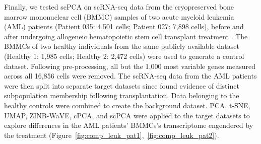 Finally, we tested scPCA on scRNA-seq data from the cryopreserved bone marrow mononuclear cell (BMMC) samples of two acute myeloid leukemia (AML) patients (Patient 035: 4,501 cells; Patient 027: 7,898 cells), before and after undergoing allogeneic hematopoietic stem cell transplant treatment \citep{Zheng2017}. The BMMCs of two healthy individuals from the same publicly available dataset (Healthy 1: 1,985 cells; Healthy 2: 2,472 cells) were used to generate a control dataset. Following pre-processing, all but the 1,000 most variable genes measured across all 16,856 cells were removed. The scRNA-seq data from the AML patients were then split into separate target datasets since \citet{Zheng2017} found evidence of distinct subpopulation membership following transplantation. Data belonging to the healthy controls were combined to create the background dataset. PCA, t-SNE, UMAP, ZINB-WaVE, cPCA, and scPCA were applied to the target datasets to explore differences in the AML patients' BMMCs's transcriptome engendered by the treatment (Figure~\ref{fig:comp_leuk_pat1},~\ref{fig:comp_leuk_pat2}).

